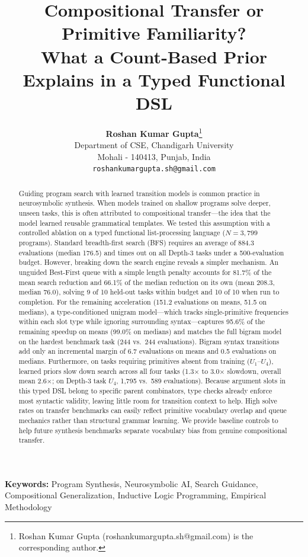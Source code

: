 \documentclass[10pt,twocolumn]{article}
\title{\textbf{Compositional Transfer or Primitive Familiarity? \\ What a Count-Based Prior Explains in a Typed Functional DSL}}
\author{
  \textbf{Roshan Kumar Gupta}\thanks{Roshan Kumar Gupta (roshankumargupta.sh@gmail.com) is the corresponding author.} \\
  Department of CSE, Chandigarh University \\
  Mohali - 140413, Punjab, India \\
  \texttt{roshankumargupta.sh@gmail.com}
}
\date{}
\begin{document}
\maketitle

\begin{abstract}
Guiding program search with learned transition models is common practice in neurosymbolic synthesis. When models trained on shallow programs solve deeper, unseen tasks, this is often attributed to compositional transfer---the idea that the model learned reusable grammatical templates. We tested this assumption with a controlled ablation on a typed functional list-processing language ($N = 3,799$ programs). Standard breadth-first search (BFS) requires an average of 884.3 evaluations (median 176.5) and times out on all Depth-3 tasks under a 500-evaluation budget. However, breaking down the search engine reveals a simpler mechanism. An unguided Best-First queue with a simple length penalty accounts for 81.7\% of the mean search reduction and 66.1\% of the median reduction on its own (mean 208.3, median 76.0), solving 9 of 10 held-out tasks within budget and 10 of 10 when run to completion. For the remaining acceleration (151.2 evaluations on means, 51.5 on medians), a type-conditioned unigram model---which tracks single-primitive frequencies within each slot type while ignoring surrounding syntax---captures 95.6\% of the remaining speedup on means (99.0\% on medians) and matches the full bigram model on the hardest benchmark task (244 vs.\ 244 evaluations). Bigram syntax transitions add only an incremental margin of 6.7 evaluations on means and 0.5 evaluations on medians. Furthermore, on tasks requiring primitives absent from training ($U_1$--$U_4$), learned priors slow down search across all four tasks (1.3$\times$ to 3.0$\times$ slowdown, overall mean 2.6$\times$; on Depth-3 task $U_4$, 1,795 vs.\ 589 evaluations). Because argument slots in this typed DSL belong to specific parent combinators, type checks already enforce most syntactic validity, leaving little room for transition context to help. High solve rates on transfer benchmarks can easily reflect primitive vocabulary overlap and queue mechanics rather than structural grammar learning. We provide baseline controls to help future synthesis benchmarks separate vocabulary bias from genuine compositional transfer.
\end{abstract}

\noindent\textbf{Keywords:} Program Synthesis, Neurosymbolic AI, Search Guidance, Compositional Generalization, Inductive Logic Programming, Empirical Methodology
\end{document}
